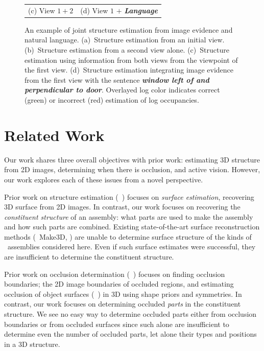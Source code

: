 \begin{figure}
\begin{tabular}{@{}c@{\hspace*{2pt}}c@{}}
    (c) View $1 + 2$ & (d) View $1$ $+$ \emph{\textbf{Language}}
  \end{tabular}
  \caption{\small An example of joint structure estimation from image evidence
    and natural language.
    (a)~Structure estimation from an initial view.
    (b)~Structure estimation from a second view alone.
    (c)~Structure estimation using information from both views from the viewpoint of the first view.
    (d)~Structure estimation integrating image evidence from the first view
    with the sentence \emph{\textbf{window left of and perpendicular to door}}.
    Overlayed log color indicates correct (green) or incorrect (red) estimation
    of log occupancies.}
  \label{fig-ll2:language}
  \par\vspace*{-3ex}
\end{figure}

\par\vspace{-1ex}
\section{Related Work}
\label{sec-ll2:related}

Our work shares three overall objectives with prior work:
estimating 3D structure from 2D images, determining when there is
occlusion, and active vision.
%
However, our work explores each of these issues from a novel perspective.

Prior work on structure estimation (\eg\ )
focuses on \emph{surface estimation}, recovering 3D surface from 2D images.
%
In contrast, our work focuses on recovering the \emph{constituent structure}
of an assembly: what parts are used to make the assembly and how such parts are
combined.
%
Existing state-of-the-art surface reconstruction methods (\eg\ Make3D,
 ) are unable to determine surface structure of the kinds of
\LincolnLog\ assemblies considered here.
%
Even if such surface estimates were successful, they are insufficient to
determine the constituent structure.

Prior work on occlusion determination (\eg\ )
focuses on finding occlusion boundaries; the 2D image boundaries of occluded
regions, and estimating occlusion of object surfaces (\eg\
) in $3$D using shape priors and symmetries.
%
In contrast, our work focuses on determining occluded \emph{parts} in the
constituent structure.
%
We see no easy way to determine occluded parts either from occlusion boundaries
or from occluded surfaces since such alone are insufficient to determine even
the number of occluded parts, let alone their types and positions in a 3D
structure.


